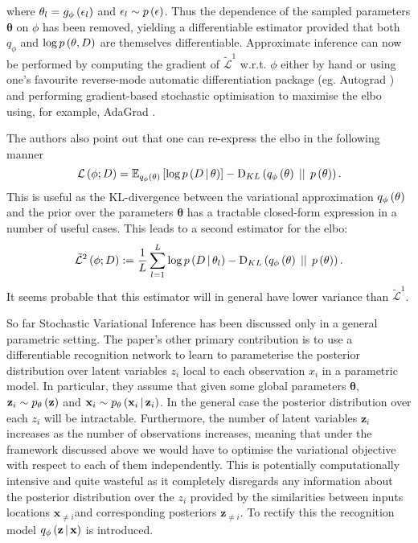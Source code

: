 \documentclass[../report.tex]{subfiles}
\begin{document}
where $\mathbf{\theta}_l = g_\phi \left( \epsilon_l\right)$ and $\epsilon_l \sim p \left( \epsilon\right)$. Thus the dependence of the sampled parameters $\mathbf{\theta}$ on $\phi$ has been removed, yielding a differentiable estimator provided that both $q_\phi$ and $\log p \left( \mathbf{\theta} ,D\right)$ are themselves differentiable. Approximate inference can now be performed by computing the gradient of $\tilde{\mathcal{L}}^1$ w.r.t. $\phi$ either by hand or using one's favourite reverse-mode automatic differentiation package (eg. Autograd \cite{maclaurinautograd}) and performing gradient-based stochastic optimisation to maximise the elbo using, for example, AdaGrad \cite{duchi2011adaptive}.

The authors also point out that one can re-express the elbo in the following manner
\begin{equation}
  \mathcal{L} \left( \phi; D\right) = \mathbb{E}_{q_\phi \left( \mathbf{\theta}\right)} \left[ \log p \left(D \, \middle\vert \, \mathbf{\theta} \right) \right] - \textrm{D}_{KL} \left( q_\phi \left( \mathbf{\theta}\right) \, \mid \mid \, p \left( \mathbf{\theta}\right)\right).
\end{equation}
This is useful as the KL-divergence between the variational approximation $q_\phi \left( \mathbf{\theta}\right)$ and the prior over the parameters $\mathbf{\theta}$ has a tractable closed-form expression in a number of useful cases. This leads to a second estimator for the elbo:
\begin{equation}
  \tilde{\mathcal{L}}^2 \left( \phi; D\right) := \frac{1}{L} \sum_{l=1}^{L} \log p \left(D \, \middle\vert \, \mathbf{\theta}_l \right) - \textrm{D}_{KL} \left( q_\phi \left( \mathbf{\theta}\right) \, \mid \mid \, p \left( \mathbf{\theta}\right)\right).
\end{equation}
It seems probable that this estimator will in general have lower variance than $\tilde{\mathcal{L}}^1$.

So far Stochastic Variational Inference has been discussed only in a general parametric setting. The paper's other primary contribution is to use a differentiable recognition network to learn to parameterise the posterior distribution over latent variables $z_i$ local to each observation $x_i$ in a parametric model. In particular, they assume that given some global parameters $\mathbf{\theta}$, $\mathbf{z}_i \sim p_\mathbf{\theta} \left( \mathbf{z}\right)$ and $\mathbf{x}_i \sim p_\mathbf{\theta} \left(\mathbf{x}_i \, \middle\vert \, \mathbf{z}_i \right)$. In the general case the posterior distribution over each $z_i$ will be intractable. Furthermore, the number of latent variables $\mathbf{z}_i$ increases as the number of observations increases, meaning that under the framework discussed above we would have to optimise the variational objective with respect to each of them independently. This is potentially computationally intensive and quite wasteful as it completely disregards any information about the posterior distribution over the $z_i$ provided by the similarities between inputs locations $\mathbf{x}_{\neq i}$and corresponding posteriors $\mathbf{z}_{\neq i}$. To rectify this the recognition model $q_\phi \left(\mathbf{z} \, \middle\vert \, \mathbf{x} \right)$ is introduced.
\end{document}
